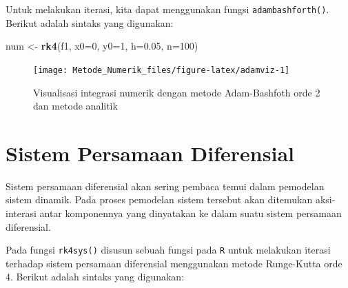\documentclass[]{book}
\newenvironment{Shaded}{\begin{snugshade}}{\end{snugshade}}
\newcommand{\DataTypeTok}[1]{\textcolor[rgb]{0.13,0.29,0.53}{#1}}
\newcommand{\DecValTok}[1]{\textcolor[rgb]{0.00,0.00,0.81}{#1}}
\newcommand{\FloatTok}[1]{\textcolor[rgb]{0.00,0.00,0.81}{#1}}
\newcommand{\KeywordTok}[1]{\textcolor[rgb]{0.13,0.29,0.53}{\textbf{#1}}}
\newcommand{\NormalTok}[1]{#1}
\newcommand{\StringTok}[1]{\textcolor[rgb]{0.31,0.60,0.02}{#1}}
\theoremstyle{definition}
\theoremstyle{definition}
\theoremstyle{definition}
\theoremstyle{remark}
\begin{document}
Untuk melakukan iterasi, kita dapat menggunakan fungsi \texttt{adambashforth()}. Berikut adalah sintaks yang digunakan:

\begin{Shaded}
\begin{Highlighting}[]
\NormalTok{num <-}\StringTok{ }\KeywordTok{rk4}\NormalTok{(f1, }\DataTypeTok{x0=}\DecValTok{0}\NormalTok{, }\DataTypeTok{y0=}\DecValTok{1}\NormalTok{, }\DataTypeTok{h=}\FloatTok{0.05}\NormalTok{, }\DataTypeTok{n=}\DecValTok{100}\NormalTok{)}
\end{Highlighting}
\end{Shaded}

\begin{figure}

{\centering \texttt{[image: Metode\_Numerik\_files/figure-latex/adamviz-1]} 

}

\caption{Visualisasi integrasi numerik dengan metode Adam-Bashfoth orde 2 dan metode analitik}\label{fig:adamviz}
\end{figure}

\hypertarget{sysdiff}{%
\section{Sistem Persamaan Diferensial}\label{sysdiff}}

Sistem persamaan diferensial akan sering pembaca temui dalam pemodelan sistem dinamik. Pada proses pemodelan sistem tersebut akan ditemukan aksi-interasi antar komponennya yang dinyatakan ke dalam suatu sistem persamaan diferensial.

Pada fungsi \texttt{rk4sys()} disusun sebuah fungsi pada \texttt{R} untuk melakukan iterasi terhadap sistem persamaan diferensial menggunakan metode Runge-Kutta orde 4. Berikut adalah sintaks yang digunakan:
\end{document}
